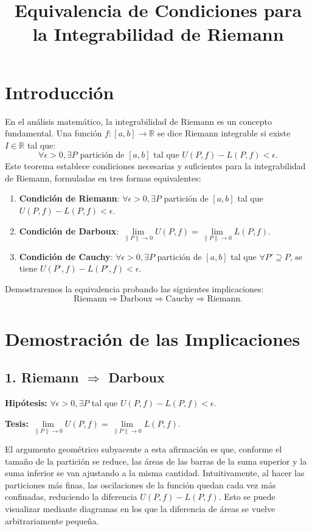 \documentclass{article}
\title{Equivalencia de Condiciones para la Integrabilidad de Riemann}
\author{}
\date{}
\begin{document}
\maketitle

\section*{Introducción}
En el análisis matemático, la integrabilidad de Riemann es un concepto fundamental. Una función $f: [a, b] \to \mathbb{R}$ se dice Riemann integrable si existe $I \in \mathbb{R}$ tal que:
\[
\forall \epsilon > 0, \exists P \text{ partición de } [a, b] \text{ tal que } U(P, f) - L(P, f) < \epsilon.
\]
Este teorema establece condiciones necesarias y suficientes para la integrabilidad de Riemann, formuladas en tres formas equivalentes:

\begin{enumerate}
    \item \textbf{Condición de Riemann}: $\forall \epsilon > 0, \exists P$ partición de $[a, b]$ tal que $U(P, f) - L(P, f) < \epsilon$.
    \item \textbf{Condición de Darboux}: $\lim\limits_{\lVert P \rVert \to 0} U(P, f) = \lim\limits_{\lVert P \rVert \to 0} L(P, f)$.
    \item \textbf{Condición de Cauchy}: $\forall \epsilon > 0, \exists P$ partición de $[a, b]$ tal que $\forall P' \supseteq P$, se tiene $U(P', f) - L(P', f) < \epsilon$.
\end{enumerate}

Demostraremos la equivalencia probando las siguientes implicaciones:
\[
\text{Riemann} \Rightarrow \text{Darboux} \Rightarrow \text{Cauchy} \Rightarrow \text{Riemann}.
\]

\section*{Demostración de las Implicaciones}

\subsection*{1. Riemann $\Rightarrow$ Darboux}
\textbf{Hipótesis:} $\forall \epsilon > 0, \exists P$ tal que $U(P, f) - L(P, f) < \epsilon$.

\textbf{Tesis:} $\lim\limits_{\lVert P \rVert \to 0} U(P, f) = \lim\limits_{\lVert P \rVert \to 0} L(P, f)$.

El argumento geométrico subyacente a esta afirmación es que, conforme el tamaño de la partición se reduce, las áreas de las barras de la suma superior y la suma inferior se van ajustando a la misma cantidad. Intuitivamente, al hacer las particiones más finas, las oscilaciones de la función quedan cada vez más confinadas, reduciendo la diferencia $U(P, f) - L(P, f)$. Esto se puede visualizar mediante diagramas en los que la diferencia de áreas se vuelve arbitrariamente pequeña.
\end{document}
